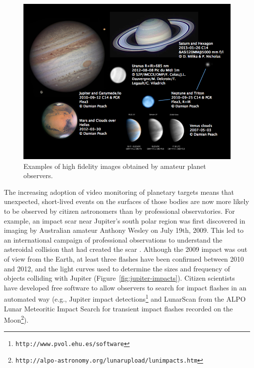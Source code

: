\documentclass{ar2e}
\def\Fref#1{Figure~\ref{#1}\xspace}
\def\CaseStudy#1{\noindent{\it\bf #1 \,\,\,\,}}
\def\url#1{\texttt{#1}}
\begin{document}
\begin{figure}[!ht]
\centering\includegraphics[width=\linewidth]{figs/planets.png}
\caption{Examples of high fidelity images obtained by amateur planet
observers.}
\label{fig:planets}
\end{figure}



\CaseStudy{Solar System Impacts.}
The increasing adoption of video monitoring of planetary targets means that
unexpected, short-lived events on the surfaces of those bodies 
are now more likely to be observed by citizen
astronomers than by professional observatories.  For example, an impact scar
near Jupiter's south polar region was first discovered in imaging by Australian
amateur Anthony Wesley on July 19th, 2009. This led to an international campaign
of professional observations to understand the asteroidal collision that had
created the scar \citep[e.g.,][]{10hammel,10depater,11orton}.  Although the 2009
impact was out of view from the Earth, at least three flashes have been
confirmed between 2010 and 2012, and the light curves used to determine the
sizes and frequency of objects colliding with Jupiter \citep[e.g.,][]{10hueso}
(\Fref{fig:jupiter-impacts}).  Citizen scientists have developed free software
to allow observers to search for impact flashes in an automated way (e.g.,
Jupiter impact detections\footnote{\url{http://www.pvol.ehu.es/software}} and
LunarScan from the ALPO Lunar Meteoritic Impact Search for transient impact
flashes recorded on the Moon\footnote{\url{http://alpo-astronomy.org/lunarupload/lunimpacts.htm}}).  
\end{document}
